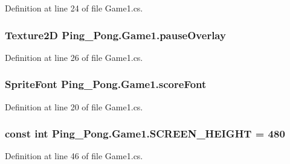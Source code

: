 Definition at line 24 of file Game1.\-cs.

\hypertarget{class_ping___pong_1_1_game1_a2ef093c4cac7c244c30664dacecc7aa2}{
\subsubsection[{pause\-Overlay}]{\setlength{\rightskip}{0pt plus 5cm}Texture2\-D Ping\-\_\-\-Pong.\-Game1.\-pause\-Overlay\hspace{0.3cm}{\ttfamily [private]}}}\label{class_ping___pong_1_1_game1_a2ef093c4cac7c244c30664dacecc7aa2}


Definition at line 26 of file Game1.\-cs.

\hypertarget{class_ping___pong_1_1_game1_adcc5e0fb3bc88b1ea3ae2c4c1a06a936}{
\subsubsection[{score\-Font}]{\setlength{\rightskip}{0pt plus 5cm}Sprite\-Font Ping\-\_\-\-Pong.\-Game1.\-score\-Font\hspace{0.3cm}{\ttfamily [private]}}}\label{class_ping___pong_1_1_game1_adcc5e0fb3bc88b1ea3ae2c4c1a06a936}


Definition at line 20 of file Game1.\-cs.

\hypertarget{class_ping___pong_1_1_game1_a6128f974e5abe6615565769664daba1c}{
\subsubsection[{S\-C\-R\-E\-E\-N\-\_\-\-H\-E\-I\-G\-H\-T}]{\setlength{\rightskip}{0pt plus 5cm}const int Ping\-\_\-\-Pong.\-Game1.\-S\-C\-R\-E\-E\-N\-\_\-\-H\-E\-I\-G\-H\-T = 480\hspace{0.3cm}{\ttfamily [private]}}}\label{class_ping___pong_1_1_game1_a6128f974e5abe6615565769664daba1c}


Definition at line 46 of file Game1.\-cs.


